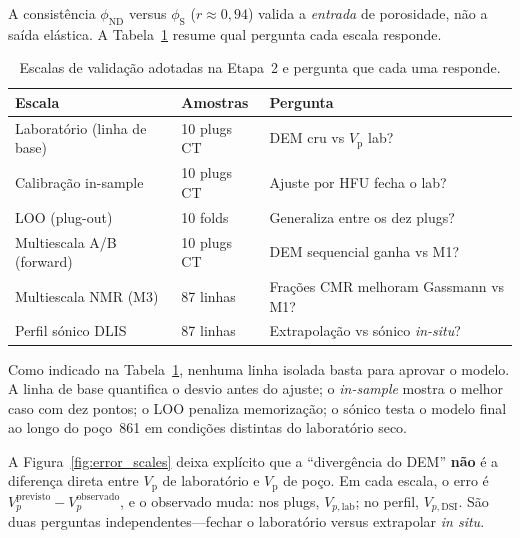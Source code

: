 \documentclass[11pt,a4paper]{article}
\numberwithin{equation}{section}
\newcommand{\phiND}{\ensuremath{\phi_{\mathrm{ND}}}}
\newcommand{\phiS}{\ensuremath{\phi_{\mathrm{S}}}}
\newcommand{\Vp}{\ensuremath{V_{\mathrm{p}}}}
\begin{document}
A consistência \phiND{} versus \phiS{} ($r \approx 0{,}94$) valida a
\emph{entrada} de porosidade, não a saída elástica.
A Tabela~\ref{tab:validation_scales} resume qual pergunta cada escala responde.

\begin{table}[H]
  \centering
  \caption{Escalas de validação adotadas na Etapa~2 e pergunta que cada
           uma responde.}
  \label{tab:validation_scales}
  \begin{tabular}{lll}
    \toprule
    Escala & Amostras & Pergunta \\
    \midrule
    Laboratório (linha de base) & 10 plugs CT & DEM cru vs \Vp{} lab? \\
    Calibração in-sample & 10 plugs CT & Ajuste por HFU fecha o lab? \\
    LOO (plug-out) & 10 folds & Generaliza entre os dez plugs? \\
    Multiescala A/B (forward) & 10 plugs CT & DEM sequencial ganha vs M1? \\
    Multiescala NMR (M3) & 87 linhas & Frações CMR melhoram Gassmann vs M1? \\
    Perfil sónico DLIS & 87 linhas & Extrapolação vs sónico \emph{in-situ}? \\
    \bottomrule
  \end{tabular}
\end{table}

Como indicado na Tabela~\ref{tab:validation_scales}, nenhuma linha isolada basta para aprovar o modelo.
A linha de base quantifica o desvio antes do ajuste; o \emph{in-sample} mostra
o melhor caso com dez pontos; o LOO penaliza memorização; o sónico
testa o modelo final ao longo do poço~861 em condições distintas do
laboratório seco.

A Figura~\ref{fig:error_scales} deixa explícito que a ``divergência do DEM''
\textbf{não} é a diferença direta entre \Vp{} de laboratório e \Vp{} de
poço.
Em cada escala, o erro é
$V_p^{\mathrm{previsto}}-V_p^{\mathrm{observado}}$, e o observado muda:
nos plugs, $V_{p,\mathrm{lab}}$; no perfil, $V_{p,\mathrm{DSI}}$.
São duas perguntas independentes---fechar o laboratório versus
extrapolar \emph{in situ}.
\end{document}
